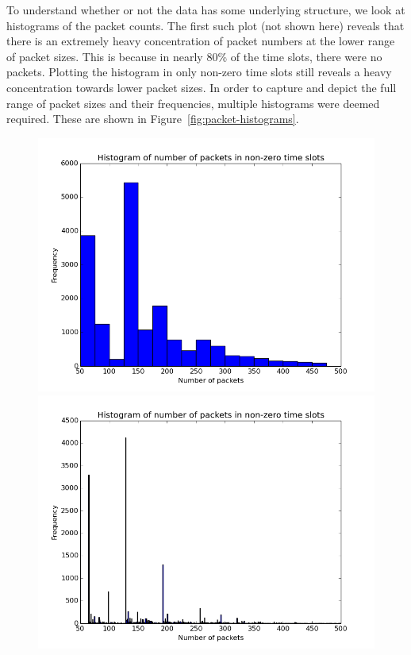 \documentclass[11pt, twoside]{article}
\begin{document}
To understand whether or not the data has some underlying structure, we look at histograms of the packet counts. The first such plot (not shown here) reveals that there is an extremely heavy concentration of packet numbers at the lower range of packet sizes. This is because in nearly 80\% of the time slots, there were no packets. Plotting the histogram in only non-zero time slots still reveals a heavy concentration towards lower packet sizes. In order to capture and depict the full range of packet sizes and their frequencies, multiple histograms were deemed required. These are shown in Figure~\ref{fig:packet-histograms}.

\begin{figure}[h!]
	\centering
	\includegraphics[scale = 0.35]{packet-hist-coarse}
	\includegraphics[scale = 0.35]{packet-hist-fine}

\end{figure}
\end{document}
